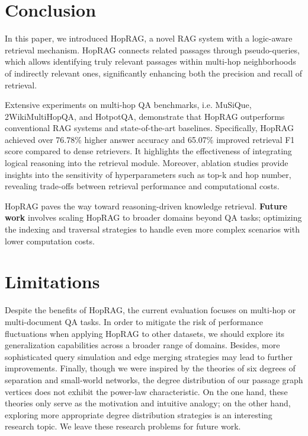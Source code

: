 \section{Conclusion}
\label{sec:conclusion}
In this paper, we introduced HopRAG, a novel RAG system with a logic-aware retrieval mechanism. HopRAG connects related passages through pseudo-queries, which allows identifying truly relevant passages within multi-hop neighborhoods of indirectly relevant ones, significantly enhancing both the precision and recall of retrieval.

Extensive experiments on multi-hop QA benchmarks, i.e. MuSiQue, 2WikiMultiHopQA, and HotpotQA, demonstrate that HopRAG outperforms conventional RAG systems and state-of-the-art baselines. Specifically, HopRAG achieved over 76.78\% higher answer accuracy and 65.07\% improved retrieval F1 score compared to dense retrievers. It highlights the effectiveness of integrating logical reasoning into the retrieval module. Moreover, ablation studies provide insights into the sensitivity of hyperparameters such as top-k and hop number, revealing trade-offs between retrieval performance and computational costs. 

HopRAG paves the way toward reasoning-driven knowledge retrieval. \textbf{Future work} involves scaling HopRAG to broader domains beyond QA tasks; optimizing the indexing and traversal strategies to handle even more complex scenarios with lower computation costs.



\section{Limitations}
Despite the benefits of HopRAG, the current evaluation focuses on multi-hop or multi-document QA tasks. In order to mitigate the risk of performance fluctuations when applying HopRAG to other datasets, we should explore its generalization capabilities across a broader range of domains. Besides, more sophisticated query simulation and edge merging strategies may lead to further improvements. Finally, though we were inspired by the theories of six degrees of separation and small-world networks, the degree distribution of our passage graph vertices does not exhibit the power-law characteristic. On the one hand, these theories only serve as the motivation and intuitive analogy; on the other hand, exploring more appropriate degree distribution strategies is an interesting research topic. We leave these research problems for future work.

